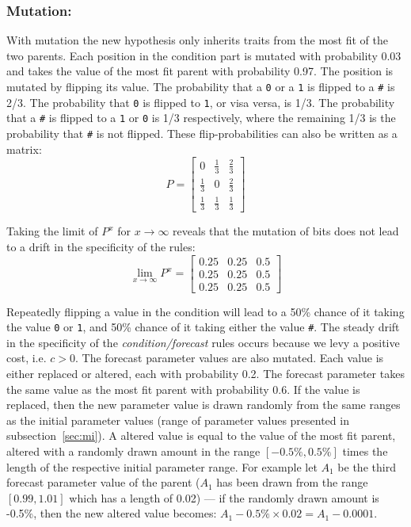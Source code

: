 \documentclass[preprint, 12pt]{elsarticle}
\begin{document}
\subsubsection*{Mutation:}
With mutation the new hypothesis only inherits traits from the most fit of the two parents. Each position in the condition part is mutated with probability 0.03 and takes the value of the most fit parent with probability 0.97. The position is mutated by flipping its value. The probability that a \texttt{0} or a \texttt{1} is flipped to a \texttt{\#} is 2/3. The probability that \texttt{0} is flipped to \texttt{1}, or visa versa, is 1/3. The probability that a \texttt{\#} is flipped to a \texttt{1} or \texttt{0} is 1/3 respectively, where the remaining 1/3 is the probability that \texttt{\#} is not flipped. These flip-probabilities can also be written as a matrix:
\begin{equation}
P = \left[ {\begin{array}{*{20}{c}} 0&{\frac{1}{3}}&{\frac{2}{3}} \\ {\frac{1}{3}}&0&{\frac{2}{3}} \\ {\frac{1}{3}}&{\frac{1}{3}}&{\frac{1}{3}} \end{array}} \right]
\end{equation}

Taking the limit of $P^x$ for $x \to \infty$ reveals that the mutation of bits does not lead to a drift in the specificity of the rules:
\begin{equation}
\mathop {\lim }\limits_{x \to \infty } {P^x} = \left[ {\begin{array}{*{20}{c}} {0.25}&{0.25}&{0.5} \\ {0.25}&{0.25}&{0.5} \\ {0.25}&{0.25}&{0.5} \end{array}} \right]
\end{equation}

Repeatedly flipping a value in the condition will lead to a 50\% chance of it taking the value \texttt{0} or \texttt{1}, and 50\% chance of it taking either the value \texttt{\#}. The steady drift in the specificity of the \emph{condition/forecast} rules occurs because we levy a positive cost, i.e. $c > 0$. The forecast parameter values are also mutated. Each value is either replaced or altered, each with probability 0.2. The forecast parameter takes the same value as the most fit parent with probability 0.6. If the value is replaced, then the new parameter value is drawn randomly from the same ranges as the initial parameter values (range of parameter values presented in subsection~\ref{sec:mi}). A altered value is equal to the value of the most fit parent, altered with a randomly drawn amount in the range $[-0.5\%, 0.5\%]$ times the length of the respective initial parameter range. For example let $A_1$ be the third forecast parameter value of the parent ($A_1$ has been drawn from the range $[0.99, 1.01]$ which has a length of 0.02) — if the randomly drawn amount is -0.5\%, then the new altered value becomes: $A_1 - 0.5\% \times 0.02 = A_1 - 0.0001$.
\end{document}
